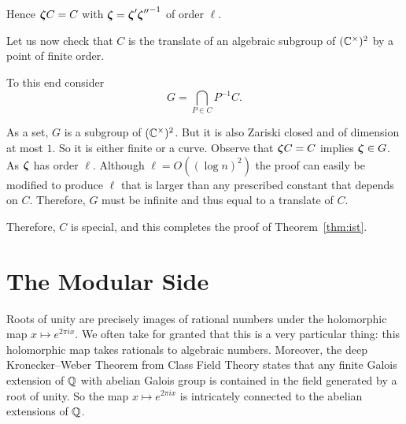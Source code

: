 Hence ${\boldsymbol{\zeta}} C=C$ with ${\boldsymbol{\zeta}} = {\boldsymbol{\zeta}}'{{\boldsymbol{\zeta}}''}^{-1}$ of order
$\ell$.

Let us now check that $C$ is the translate of an algebraic subgroup of
$({\mathbb{C}}^\times)^2$ by a point of finite order. %

To this end consider
\begin{equation*}
  G = \bigcap_{P\in C} P^{-1} C.
\end{equation*}

As a set, $G$ is a subgroup of $({\mathbb{C}}^\times)^2$. But it is also Zariski
closed and of dimension at most $1$. So it is either finite or a
curve. Observe that ${\boldsymbol{\zeta}} C = C$ implies ${\boldsymbol{\zeta}}\in G$. As
${\boldsymbol{\zeta}}$ has order $\ell$. Although $\ell = O((\log n)^2)$ the proof
can easily be modified to produce $\ell$ that is larger than any
prescribed constant that depends on $C$. Therefore, $G$ must be
infinite and thus equal to a translate of $C$.

Therefore, $C$ is special, and this completes the proof of
Theorem~\ref{thm:ist}.






\section{The Modular Side}

Roots of unity are precisely images of rational numbers under the
holomorphic map $x\mapsto e^{2\pi i x}$. We often take for granted
that this is a very particular thing: this holomorphic map takes
rationals to algebraic numbers. Moreover, the deep Kronecker--Weber
Theorem from Class Field Theory states that any finite Galois
extension of ${\mathbb{Q}}$ with abelian Galois group is contained in the field
generated by a root of unity. So the map $x\mapsto e^{2\pi i x}$ is
intricately connected to the abelian extensions of ${\mathbb{Q}}$.

